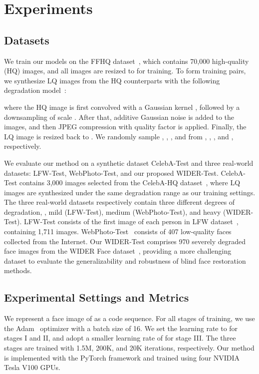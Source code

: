 

\section{Experiments}
\subsection{Datasets}
We train our models on the FFHQ dataset~\cite{karras2019style}, which contains 70,000 high-quality (HQ) images, and all images are resized to  for training.
To form training pairs, we synthesize LQ images  from the HQ counterparts  with the following degradation model~\cite{li2020blind, wang2021towards, yang2021gan}: 

where the HQ image  is first convolved with a Gaussian kernel , followed by a downsampling of scale . After that, additive Gaussian noise  is added to the images, and then JPEG compression with quality factor  is applied. Finally, the LQ image is resized back to .
We randomly sample , , , and  from , , , and , respectively.


We evaluate our method on a synthetic dataset CelebA-Test and three real-world datasets: LFW-Test, WebPhoto-Test, and our proposed WIDER-Test.
CelebA-Test contains 3,000 images selected from the CelebA-HQ dataset~\cite{karras2018progressive}, where LQ images are synthesized under the same degradation range as our training settings.
The three real-world datasets respectively contain three different degrees of degradation, \ie, mild (LFW-Test), medium (WebPhoto-Test), and heavy (WIDER-Test).
LFW-Test consists of the first image of each person in LFW dataset~\cite{huang2008labeled}, containing 1,711 images.
WebPhoto-Test~\cite{wang2021towards} consists of 407 low-quality faces collected from the Internet. 
Our WIDER-Test comprises 970 severely degraded face images from the WIDER Face dataset~\cite{yang2016wider}, providing a more challenging dataset to evaluate the generalizability and robustness of blind face restoration methods. 
\subsection{\bf Experimental Settings and Metrics}
\label{sec:settings}
We represent a face image of  as a  code sequence.
For all stages of training, we use the Adam~\cite{kingma2014adam} optimizer with a batch size of 16.
We set the learning rate to  for stages I and II, and adopt a smaller learning rate of  for stage III.
The three stages are trained with 1.5M, 200K, and 20K iterations, respectively.
Our method is implemented with the PyTorch framework and trained using four NVIDIA Tesla V100 GPUs.


